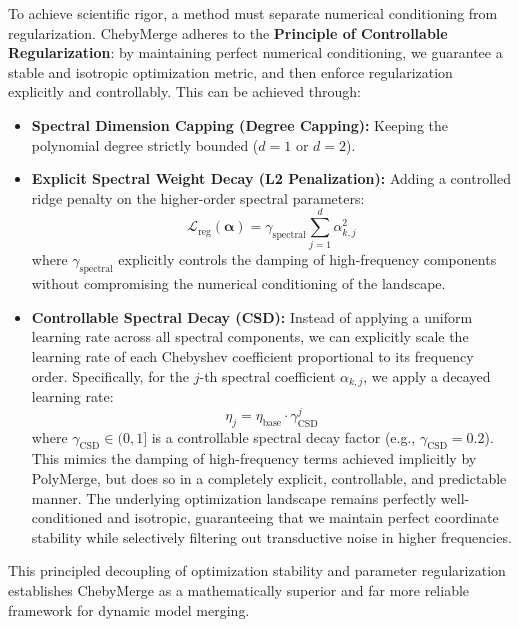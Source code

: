 To achieve scientific rigor, a method must separate numerical conditioning from regularization. ChebyMerge adheres to the \textbf{Principle of Controllable Regularization}: by maintaining perfect numerical conditioning, we guarantee a stable and isotropic optimization metric, and then enforce regularization explicitly and controllably. This can be achieved through:
\begin{itemize}
    \item \textbf{Spectral Dimension Capping (Degree Capping):} Keeping the polynomial degree strictly bounded ($d=1$ or $d=2$).
    \item \textbf{Explicit Spectral Weight Decay (L2 Penalization):} Adding a controlled ridge penalty on the higher-order spectral parameters:
    \begin{equation}
    \mathcal{L}_{\text{reg}}(\boldsymbol{\alpha}) = \gamma_{\text{spectral}} \sum_{j=1}^d \alpha_{k, j}^2
    \end{equation}
    where $\gamma_{\text{spectral}}$ explicitly controls the damping of high-frequency components without compromising the numerical conditioning of the landscape.
    \item \textbf{Controllable Spectral Decay (CSD):} Instead of applying a uniform learning rate across all spectral components, we can explicitly scale the learning rate of each Chebyshev coefficient proportional to its frequency order. Specifically, for the $j$-th spectral coefficient $\alpha_{k, j}$, we apply a decayed learning rate:
    \begin{equation}
    \eta_j = \eta_{\text{base}} \cdot \gamma_{\text{CSD}}^j
    \end{equation}
    where $\gamma_{\text{CSD}} \in (0, 1]$ is a controllable spectral decay factor (e.g., $\gamma_{\text{CSD}} = 0.2$). This mimics the damping of high-frequency terms achieved implicitly by PolyMerge, but does so in a completely explicit, controllable, and predictable manner. The underlying optimization landscape remains perfectly well-conditioned and isotropic, guaranteeing that we maintain perfect coordinate stability while selectively filtering out transductive noise in higher frequencies.
\end{itemize}
This principled decoupling of optimization stability and parameter regularization establishes ChebyMerge as a mathematically superior and far more reliable framework for dynamic model merging.
